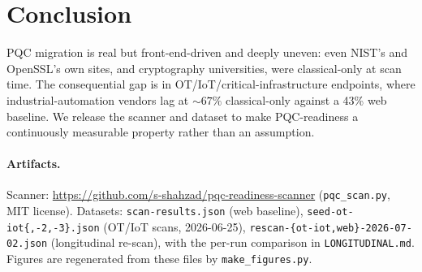 \documentclass[11pt]{article}
\newcommand{\code}[1]{\texttt{#1}}
\begin{document}
\section{Conclusion}

PQC migration is real but front-end-driven and deeply uneven: even NIST's and OpenSSL's
own sites, and cryptography universities, were classical-only at scan time. The
consequential gap is in OT/IoT/critical-infrastructure endpoints, where
industrial-automation vendors lag at ${\sim}67\%$ classical-only against a 43\% web
baseline. We release the scanner and dataset to make PQC-readiness a continuously
measurable property rather than an assumption.

\paragraph{Artifacts.}
Scanner: \url{https://github.com/s-shahzad/pqc-readiness-scanner} (\code{pqc\_scan.py},
MIT license). Datasets: \code{scan-results.json} (web baseline),
\code{seed-ot-iot\{,-2,-3\}.json} (OT/IoT scans, 2026-06-25),
\code{rescan-\{ot-iot,web\}-2026-07-02.json} (longitudinal re-scan), with the
per-run comparison in \code{LONGITUDINAL.md}. Figures are regenerated from these
files by \code{make\_figures.py}.
\end{document}
